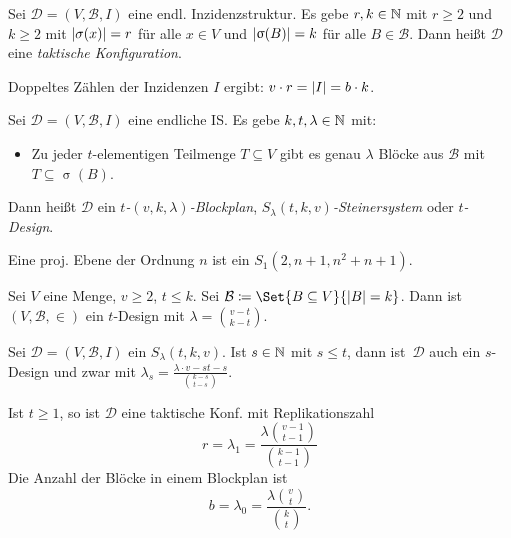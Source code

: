 \documentclass{cheat-sheet}
\newcommand{\Design}{\mathcal{D}} %
\newcommand{\Blocks}{\mathcal{B}} %
\begin{document}
\begin{defn}
  Sei $\Design = (V, \Blocks, I)$ eine endl. Inzidenzstruktur.
  Es gebe $r, k \in \mathbb{N}$ mit $r \geq 2$ und $k \geq 2$ mit $\lvert\sigma(x)\rvert = r$ für alle $x \in V$ und $\abs{\upsigma(B)} = k$ für alle $B \in \Blocks$.
  Dann heißt $\Design$ eine \emph{taktische Konfiguration}.
\end{defn}

\begin{bem}
  Doppeltes Zählen der Inzidenzen $I$ ergibt: \enspace
  $v \cdot r = \lvert I\rvert = b \cdot k$.
\end{bem}

\begin{defn}
  Sei $\Design = (V, \Blocks, I)$ eine endliche IS.
  Es gebe $k, t, \lambda \in \mathbb{N}$ mit:
  \begin{itemize}
    \miniitem{0.4 \linewidth}{$\abs{\upsigma(B)} = k$ für alle $B \in \Blocks$,}
    \item Zu jeder $t$-elementigen Teilmenge $T \subseteq V$ gibt es genau $\lambda$ Blöcke aus $\Blocks$ mit $T \subseteq \upsigma(B)$.
  \end{itemize}
  Dann heißt $\Design$ ein \emph{$t$-$(v, k, \lambda)$-Blockplan}, \emph{$S_\lambda(t, k, v)$-Steinersystem} oder \emph{$t$-Design}.
\end{defn}

\begin{bsp}
  Eine proj. Ebene der Ordnung $n$ ist ein $S_1(2, n + 1, n^2 + n + 1)$.
\end{bsp}

\begin{bsp}
  Sei $V$ eine Menge, $v \geq 2$, $t \leq k$.
  Sei $\Blocks \coloneqq \Set{B \subseteq V}{\abs{B} = k}$.
  Dann ist $(V, \Blocks, {\in})$ ein $t$-Design mit $\lambda = \binom{v - t}{k - t}$.
\end{bsp}

\begin{prop}
  Sei $\Design = (V, \Blocks, I)$ ein $S_\lambda(t, k, v)$.
  Ist $s \in \mathbb{N}$ mit $s \leq t$, dann ist~$\Design$ auch ein $s$-Design und zwar mit $\lambda_s = \frac{\lambda \cdot {v -s t-s}}{\binom{k-s}{t-s}}$.
\end{prop}

\begin{kor}
  Ist $t \geq 1$, so ist $\Design$ eine taktische Konf. mit Replikationszahl
  \[ r = \lambda_1 = \frac{\lambda \binom{v-1}{t-1}}{\binom{k-1}{t-1}} \]
  Die Anzahl der Blöcke in einem Blockplan ist
  \[ b = \lambda_0 = \frac{\lambda \binom{v}{t}}{\binom{k}{t}}. \]
\end{kor}
\end{document}
